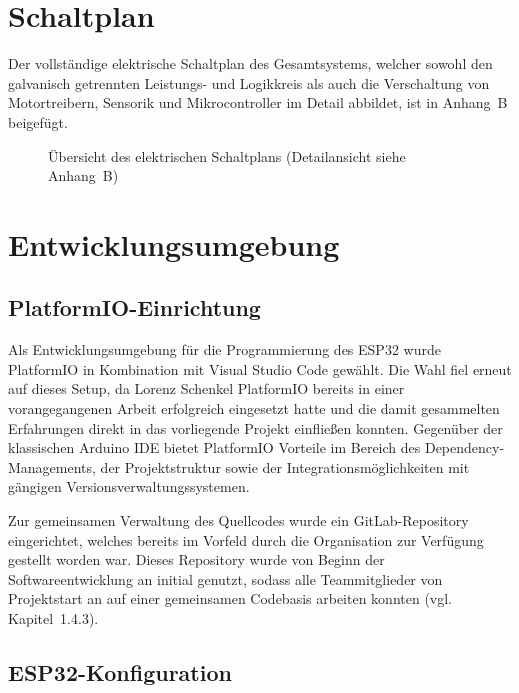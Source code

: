 \documentclass[12pt,ngerman,numbers=noenddot,abstracton,headsepline]{scrreprt}
\begin{document}
\section{Schaltplan}
\label{sec:schaltplan}

Der vollständige elektrische Schaltplan des Gesamtsystems, welcher sowohl den galvanisch getrennten Leistungs- und Logikkreis als auch die Verschaltung von Motortreibern, Sensorik und Mikrocontroller im Detail abbildet, ist in Anhang~B beigefügt.

\begin{figure}[h]
    \centering
    \caption{Übersicht des elektrischen Schaltplans (Detailansicht siehe Anhang~B)}
    \label{fig:schaltplan_uebersicht}
\end{figure}

\section{Entwicklungsumgebung}
\label{sec:entwicklungsumgebung}

\subsection{PlatformIO-Einrichtung}
\label{subsec:platformio_einrichtung}

Als Entwicklungsumgebung für die Programmierung des ESP32 wurde PlatformIO in Kombination mit Visual Studio Code gewählt. Die Wahl fiel erneut auf dieses Setup, da Lorenz Schenkel PlatformIO bereits in einer vorangegangenen Arbeit erfolgreich eingesetzt hatte und die damit gesammelten Erfahrungen direkt in das vorliegende Projekt einfließen konnten. Gegenüber der klassischen Arduino IDE bietet PlatformIO Vorteile im Bereich des Dependency-Managements, der Projektstruktur sowie der Integrationsmöglichkeiten mit gängigen Versionsverwaltungssystemen.

Zur gemeinsamen Verwaltung des Quellcodes wurde ein GitLab-Repository eingerichtet, welches bereits im Vorfeld durch die Organisation zur Verfügung gestellt worden war. Dieses Repository wurde von Beginn der Softwareentwicklung an initial genutzt, sodass alle Teammitglieder von Projektstart an auf einer gemeinsamen Codebasis arbeiten konnten (vgl. Kapitel~1.4.3).

\subsection{ESP32-Konfiguration}
\label{subsec:esp32_konfiguration}
\end{document}

